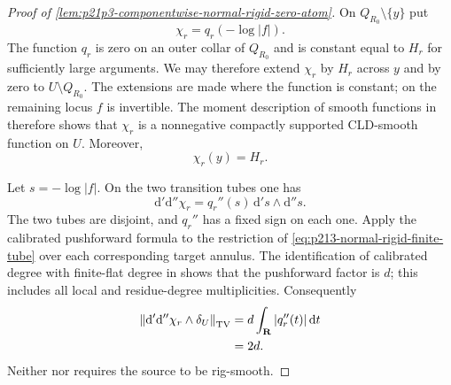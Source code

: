 \begin{proof}[Proof of
\cref{lem:p21p3-componentwise-normal-rigid-zero-atom}]
On $Q_{R_0}\setminus\{y\}$ put
\[
                         \chi_r=q_r(-\log|f|).
\]
The function $q_r$ is zero on an outer collar of $Q_{R_0}$ and is constant
equal to $H_r$ for sufficiently large arguments.  We may therefore extend
$\chi_r$ by $H_r$ across $y$ and by zero to $U\setminus Q_{R_0}$.  The
extensions are made where the function is constant; on the remaining locus
$f$ is invertible.  The moment description of smooth functions in
\cite[Corollary~15.1.2]{CLD25} therefore shows that $\chi_r$ is a
nonnegative compactly supported CLD-smooth function on $U$.  Moreover,
\begin{equation}
\label{eq:p213-normal-rigid-value-at-y}
                         \chi_r(y)=H_r.
\end{equation}

Let $s=-\log|f|$.  On the two transition tubes one has
\begin{equation}
\label{eq:p213-normal-rigid-radial-dd}
       \mathrm d'\mathrm d''\chi_r
       =q_r''(s)\,\mathrm d's\wedge\mathrm d''s.
\end{equation}
The two tubes are disjoint, and $q_r''$ has a fixed sign on each one.
Apply the calibrated pushforward formula
\cite[Proposition~14.4.2]{CLD25} to the restriction of
\eqref{eq:p213-normal-rigid-finite-tube} over each corresponding target
annulus.  The identification of calibrated degree with finite-flat degree
in \cite[Lemma~13.3.8]{CLD25} shows that the pushforward factor is $d$;
this includes all local and residue-degree multiplicities.  Consequently
\begin{align}
 \left\|\mathrm d'\mathrm d''\chi_r\wedge\delta_U
 \right\|_{\mathrm{TV}}
 &=d\int_{\mathbf R}|q_r''(t)|\,\mathrm dt \notag\\
 &=2d.
\label{eq:p213-normal-rigid-radial-tv}
\end{align}
Neither \cite[Proposition~14.4.2]{CLD25} nor
\cite[Lemma~13.3.8]{CLD25} requires the source to be rig-smooth.


\end{proof}
